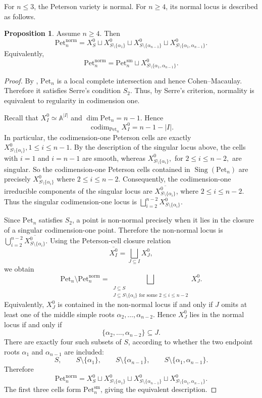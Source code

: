 \documentclass[12pt, reqno]{amsart}
\theoremstyle{plain}
\numberwithin{equation}{section}
\theoremstyle{definition}
\newtheorem{proposition}[theorem]{Proposition}
\begin{document}
For \(n\le3\), the Peterson variety is normal. For \(n\ge4\), its
normal locus is described as follows.

\begin{proposition}\label{prop:normal-locus}
Assume \(n\ge4\). Then
\[
\mathrm{Pet}_n^{\mathrm{norm}}
=
X_S^0
\sqcup
X_{S\setminus\{\alpha_1\}}^0
\sqcup
X_{S\setminus\{\alpha_{n-1}\}}^0
\sqcup
X_{S\setminus\{\alpha_1,\alpha_{n-1}\}}^0.
\]
Equivalently,
\[
\mathrm{Pet}_n^{\mathrm{norm}}
=
\mathrm{Pet}_n^{\mathrm{sm}}
\sqcup
X_{S\setminus\{\alpha_1,\alpha_{n-1}\}}^0.
\]
\end{proposition}

\begin{proof}
By \cite[Corollary~7]{Insko}, \(\mathrm{Pet}_n\) is a local complete
intersection and hence Cohen--Macaulay. Therefore it satisfies
Serre's condition \(S_2\). Thus, by Serre's criterion, normality is equivalent to
regularity in codimension one.

Recall that $X_I^0\simeq\mathbb A^{|I|}$ and $\dim\mathrm{Pet}_n=n-1.$
Hence
\[
\operatorname{codim}_{\mathrm{Pet}_n}X_I^0
=
n-1-|I|.
\]
In particular, the codimension-one Peterson cells are exactly $X_{S\setminus\{\alpha_i\}}^0, 1\le i\le n-1.$ By the description of the singular locus above, the cells with
\(i=1\) and \(i=n-1\) are smooth, whereas $X_{S\setminus\{\alpha_i\}}^0,$ for $2\le i\le n-2,$ are singular. So the codimension-one Peterson cells contained in
\(\operatorname{Sing}(\mathrm{Pet}_n)\) are precisely $
X_{S\setminus\{\alpha_i\}}^0$ where $2\le i\le n-2.$
Consequently, the codimension-one irreducible components of the
singular locus are $\overline{X_{S\setminus\{\alpha_i\}}^0}$, where $2\le i\le n-2.$ Thus the singular codimension-one locus is $\bigsqcup_{i=2}^{n-2}
X_{S\setminus\{\alpha_i\}}^0.$

Since \(\mathrm{Pet}_n\) satisfies \(S_2\), a point is non-normal
precisely when it lies in the closure of a singular codimension-one
point. Therefore the non-normal locus is $\bigcup_{i=2}^{n-2}
\overline{X_{S\setminus\{\alpha_i\}}^0}.$
Using the Peterson-cell closure relation
\[
\overline{X_I^0}
=
\bigsqcup_{J\subseteq I}X_J^0,
\]
we obtain
\[
\mathrm{Pet}_n\setminus\mathrm{Pet}_n^{\mathrm{norm}}
=
\bigsqcup_{\substack{J\subseteq S\\
J\subseteq S\setminus\{\alpha_i\}
\text{ for some }2\le i\le n-2}}
X_J^0.
\]
Equivalently, \(X_J^0\) is contained in the non-normal locus if and
only if \(J\) omits at least one of the middle simple roots $\alpha_2,\ldots,\alpha_{n-2}.$
Hence \(X_J^0\) lies in the normal locus if and only if
\[
\{\alpha_2,\ldots,\alpha_{n-2}\}\subseteq J.
\]
There are exactly four such subsets of \(S\), according to whether
the two endpoint roots \(\alpha_1\) and \(\alpha_{n-1}\) are included:
\[
S,\qquad
S\setminus\{\alpha_1\},\qquad
S\setminus\{\alpha_{n-1}\},\qquad
S\setminus\{\alpha_1,\alpha_{n-1}\}.
\]
Therefore
\[
\mathrm{Pet}_n^{\mathrm{norm}}
=
X_S^0
\sqcup
X_{S\setminus\{\alpha_1\}}^0
\sqcup
X_{S\setminus\{\alpha_{n-1}\}}^0
\sqcup
X_{S\setminus\{\alpha_1,\alpha_{n-1}\}}^0.
\]
The first three cells form \(\mathrm{Pet}_n^{\mathrm{sm}}\), giving
the equivalent description.
\end{proof}
\end{document}
